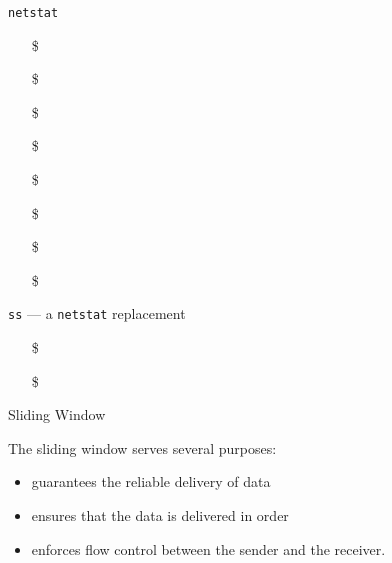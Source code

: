 \begin{frame}{\texttt{netstat}}
  
  \begin{minipage}[t]{.35\linewidth}
    \begin{itemize}
    \item[\$] 
    \item[\$] 
    \item[\$] 
    \item[\$] 
    \end{itemize}
  \end{minipage}\hfill
  \begin{minipage}[t]{.6\linewidth}
    \begin{itemize}
    \item[\$] 
    \item[\$] 
    \item[\$] 
    \item[\$] 
    \end{itemize}
  \end{minipage}
  
  \begin{block}{\texttt{ss} --- a \texttt{netstat} replacement}
    \begin{itemize}
    \item[\$] 
    \item[\$] 
    \end{itemize}
  \end{block}
\end{frame}

\begin{frame}{Sliding Window}
  \begin{center}
  \end{center}
  \begin{iblock}{The sliding window serves several purposes:}
    \begin{itemize}
    \item guarantees the reliable delivery of data
    \item ensures that the data is delivered in order
    \item enforces flow control between the sender and the receiver.
    \end{itemize}
  \end{iblock}
\end{frame}

